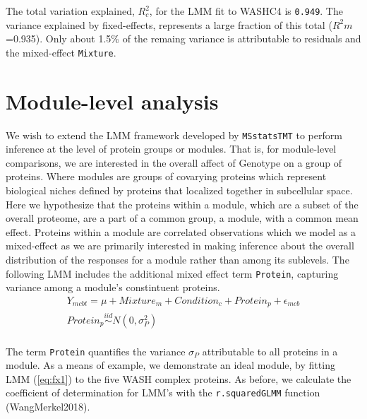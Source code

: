 \documentclass[12pt]{elife}\usepackage[]{graphicx}\usepackage[]{color}
\begin{document}
The total variation explained, $R^2_{c}$, for the LMM fit to WASHC4 is 
\texttt{0.949}. The variance explained by fixed-effects, represents a large
fraction of this total ($R^2{m}$=0.935). Only about 1.5\% of the remaing
variance is attributable to residuals and the mixed-effect \texttt{Mixture}.\\


\section{Module-level analysis}

We wish to extend the LMM framework developed by \texttt{MSstatsTMT} to perform 
inference at the level of protein groups or modules.
That is, for module-level comparisons, we are interested in the overall affect 
of Genotype on a group of proteins. Where modules are groups of covarying 
proteins which represent biological niches defined by proteins that 
localized together in subcellular space.\\

Here we hypothesize that the proteins within a module, which are a subset of the
overall proteome,  are a part of a common group, a module, with a common mean
effect. Proteins within a module are correlated observations which we model as a
mixed-effect as we are primarily interested in making inference about the
overall distribution of the responses for a module rather than among its
sublevels. The following LMM includes the additional mixed effect term
\texttt{Protein}, capturing variance among a module's constintuent proteins.\\

\begin{equation} 
  \begin{gathered}\label{eq:fx1} %
	Y_{mcbt} = \mu + Mixture_m + Condition_c + Protein_p + \epsilon_{mcb}\\
	Protein_p \stackrel{iid}{\sim} N(0,\sigma^2_P) \\
  \end{gathered}
\end{equation}

The term \texttt{Protein} quantifies the variance $\sigma_P$ attributable to all
proteins in a module.  As a means of example, we demonstrate an ideal module, by
fitting LMM (\ref{eq:fx1}) to the five WASH complex proteins.  As before, we
calculate the coefficient of determination for LMM's with the
\texttt{r.squaredGLMM} function (WangMerkel2018).\\
\end{document}
